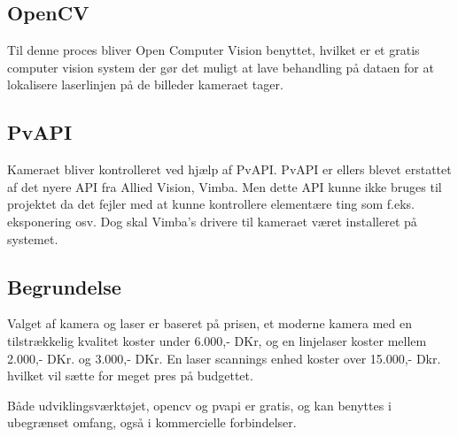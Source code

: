 \subsection{OpenCV}
Til denne proces bliver Open Computer Vision \cite{OpenCV} benyttet, hvilket er et gratis computer vision system der gør det muligt at lave behandling på dataen for at lokalisere laserlinjen på de billeder kameraet tager.

\subsection{PvAPI}
Kameraet bliver kontrolleret ved hjælp af PvAPI. PvAPI er ellers blevet erstattet af det nyere API fra Allied Vision, Vimba. Men dette API kunne ikke bruges til projektet da det fejler med at kunne kontrollere elementære ting som f.eks. eksponering osv.
Dog skal Vimba's drivere til kameraet været installeret på systemet.

\subsection{Begrundelse}
Valget af kamera og laser er baseret på prisen, et moderne kamera med en tilstrækkelig kvalitet koster under 6.000,- DKr, og en linjelaser koster mellem 2.000,- DKr. og 3.000,- DKr. En laser scannings enhed koster over 15.000,- Dkr. hvilket vil sætte for meget pres på budgettet.

Både udviklingsværktøjet, opencv og pvapi er gratis, og kan benyttes i ubegrænset omfang, også i kommercielle forbindelser.
